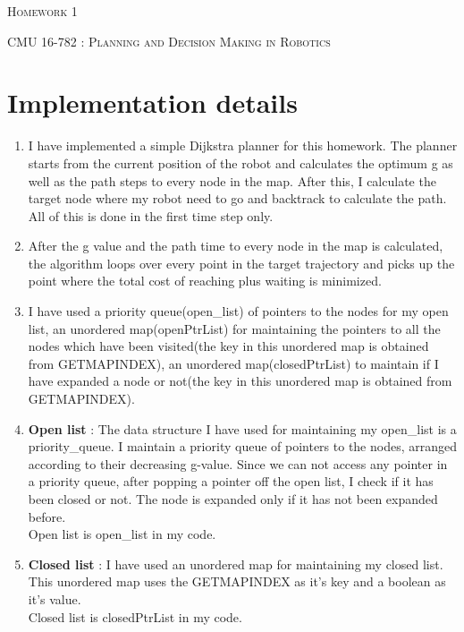 \documentclass[12pt]{article}
\begin{document}
\begin{center}
  \centerline{\textsc{\LARGE  Homework 1}}
  \vspace{1em}
  \textsc{\large CMU 16-782 : Planning and Decision Making in Robotics} \\
\end{center}

\section*{Implementation details}
\begin{enumerate}
    \item I have implemented a simple Dijkstra planner for this homework. The planner starts from the current position of the robot and calculates the optimum g as well as the path steps to every node in the map. After this, I calculate the target node where my robot need to go and backtrack to calculate the path. All of this is done in the first time step only.   
    \item After the g value and the path time to every node in the map is calculated, the algorithm loops over every point in the target trajectory and picks up the point where the total cost of reaching plus waiting is minimized.
    
    \item I have used a priority queue(open\_list) of pointers to the nodes for my open list, an unordered map(openPtrList) for maintaining the pointers to all the nodes which have been visited(the key in this unordered map is obtained from GETMAPINDEX), an unordered map(closedPtrList) to maintain if I have expanded a node or not(the key in this unordered map is obtained from GETMAPINDEX).
    
    \item \textbf{Open list} : The data structure I have used for maintaining my open\_list is a priority\_queue. I maintain a priority queue of pointers to the nodes, arranged according to their decreasing g-value. Since we can not access any pointer in a priority queue, after popping a pointer off the open list, I check if it has been closed or not. The node is expanded only if it has not been expanded before. \\
    Open list is open\_list in my code. 
    
    \item \textbf{Closed list} : I have used an unordered map for maintaining my closed list. This unordered map uses the GETMAPINDEX as it's key and a boolean as it's value. \\
    Closed list is closedPtrList in my code.
    

\end{enumerate}
\end{document}
